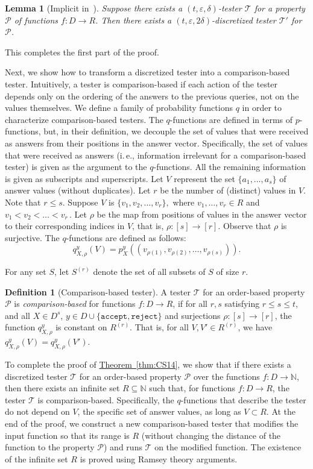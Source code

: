 \documentclass[11pt]{article}
\numberwithin{equation}{section}
\newtheorem{lemma}[theorem]{Lemma}
\theoremstyle{definition}
\newtheorem{definition}[theorem]{Definition}
\theoremstyle{plain}
\newcommand{\N}{\mathbb N}
\newcommand{\ie}{i.\,e.}
\newcommand{\expref}[2]{\hyperref[#2]{#1~\ref{#2}}}
\newcommand{\eps}{\varepsilon}
\newcommand{\cP}{\ensuremath{\mathcal{P}}}
\newcommand{\cT}{\ensuremath{\mathcal{T}}}
\newcommand{\Thm}[1]{\expref{Theorem}{thm:#1}}
\begin{document}
\begin{lemma}[Implicit in~{\cite[Lemma~2.2]{CS14}}] \label{lem:disc-test}
Suppose there exists a $(t,\eps,\delta)$-tester $\cT$ for a property $\cP$ of functions $f:D \to R$.
Then there exists a $(t,\eps,2\delta)$-discretized tester $\cT'$ for $\cP$.
\end{lemma}

This completes the first part of the proof.

Next, we show how to transform a discretized tester into a comparison-based tester.
Intuitively, a tester is comparison-based if each action of the tester depends only on the ordering of the answers to the previous queries, not on the values themselves.
We define a family of probability functions $q$ in order to characterize comparison-based testers.
The $q$-functions are defined in terms of $p$-functions, but, in their definition, we decouple the set of values that were received as answers from their positions in the answer vector. Specifically, the set of values that were received as answers (\ie, information irrelevant for
a %
comparison-based tester) is given as the argument to the $q$-functions. All the remaining information is given as subscripts and superscripts.
Let $V$ represent the set $\{a_1, \ldots, a_s\}$ of answer values (without duplicates).
Let $r$ be the number of (distinct) values in $V$. Note that $r \leq s$.
Suppose $V$ is $\{v_1, v_2, \ldots, v_r\},$ where $v_1, \ldots, v_r \in R$ 
and $v_1 < v_2 < \ldots < v_r$\,. %
Let $\rho$ be the map from positions of values in the answer vector to their corresponding indices in $V$, that is, $\rho:[s] \to [r]$. Observe that $\rho$ is surjective.
The $q$-functions are defined as follows:
\[q_{X,\rho}^y(V) = p_X^y((v_{\rho(1)}, v_{\rho(2)}, \ldots,v_{\rho(s)})).\]


For any set $S$, let $S^{(r)}$ denote the set of all subsets of $S$ of size $r$.

\begin{definition} [Comparison-based tester]\label{def:cbt}
A tester $\cT$ for an order-based property $\cP$ is \emph{comparison-based} for functions $f:D \to R$, if for all $r,s$ satisfying $ r \leq s \leq t$, and all $X \in D^s$, $y \in D \cup \{\texttt{accept}, \texttt{reject}\}$ and surjections $\rho:[s] \to [r]$, the function $q_{X,\rho}^y$ is constant on $R^{(r)}$. That is, for all $V, V' \in R^{(r)}$, we have $q_{X,\rho}^y(V) = q_{X,\rho}^y(V')$.
\end{definition}

To complete the proof of \Thm{CS14}, we show that if there exists a discretized tester $\cT$ for an order-based property $\cP$ over the functions $f:D \to \N$, then there exists an infinite set $R \subseteq \N$ such that, for functions $f:D \to R$, the tester $\cT$ is comparison-based. Specifically, the $q$-functions that describe the tester do not depend on $V$, the specific set of answer values, as long as $V\subset R$. At the end of the proof, we construct a new comparison-based tester that modifies the input function so that its range is $R$ (without changing the distance of the function to the property $\cP$) and runs $\cT$ on the modified function.
The existence of the infinite set $R$ is proved using Ramsey theory arguments.
\end{document}
